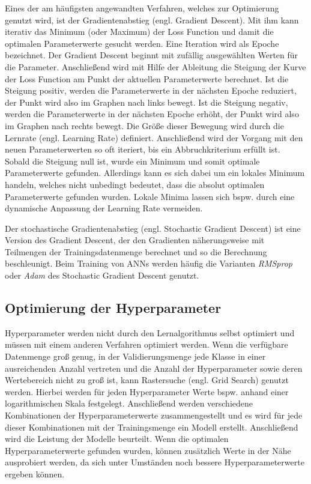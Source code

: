 Eines der am häufigsten angewandten Verfahren, welches zur Optimierung genutzt wird, ist der Gradientenabstieg (engl. Gradient Descent). Mit ihm kann iterativ das Minimum (oder Maximum) der Loss Function und damit die optimalen Parameterwerte gesucht werden. Eine Iteration wird als Epoche bezeichnet. Der Gradient Descent beginnt mit zufällig ausgewählten Werten für die Parameter. Anschließend wird mit Hilfe der Ableitung die Steigung der Kurve der Loss Function am Punkt der aktuellen Parameterwerte berechnet. Ist die Steigung positiv, werden die Parameterwerte in der nächsten Epoche reduziert, der Punkt wird also im Graphen nach links bewegt. Ist die Steigung negativ, werden die Parameterwerte in der nächsten Epoche erhöht, der Punkt wird also im Graphen nach rechts bewegt. Die Größe dieser Bewegung wird durch die Lernrate (engl. Learning Rate) definiert. Anschließend wird der Vorgang mit den neuen Parameterwerten so oft iteriert, bis ein Abbruchkriterium erfüllt ist. Sobald die Steigung null ist, wurde ein Minimum und somit optimale Parameterwerte gefunden. Allerdings kann es sich dabei um ein lokales Minimum handeln, welches nicht unbedingt bedeutet, dass die absolut optimalen Parameterwerte gefunden wurden. Lokale Minima lassen sich bspw. durch eine dynamische Anpassung der Learning Rate vermeiden. \cite{nguyen_machine_2018}

Der stochastische Gradientenabstieg (engl. Stochastic Gradient Descent) ist eine Version des Gradient Descent, der den Gradienten näherungsweise mit Teilmengen der Trainingsdatenmenge berechnet und so die Berechnung beschleunigt. Beim Training von \gls{ANN}s werden häufig die Varianten \textit{RMSprop} oder \textit{Adam} des Stochastic Gradient Descent genutzt. \cite{burkov_machine_2019}

\subsection{Optimierung der Hyperparameter} 

Hyperparameter werden nicht durch den Lernalgorithmus selbst optimiert und müssen mit einem anderen Verfahren optimiert werden. Wenn die verfügbare Datenmenge groß genug, in der Validierungsmenge jede Klasse in einer ausreichenden Anzahl vertreten und die Anzahl der Hyperparameter sowie deren Wertebereich nicht zu groß ist, kann Rastersuche (engl. Grid Search) genutzt werden. Hierbei werden für jeden Hyperparameter Werte bspw. anhand einer logarithmischen Skala festgelegt. Anschließend werden verschiedene Kombinationen der Hyperparameterwerte zusammengestellt und es wird für jede dieser Kombinationen mit der Trainingsmenge ein Modell erstellt. Anschließend wird die Leistung der Modelle beurteilt. Wenn die optimalen Hyperparameterwerte gefunden wurden, können zusätzlich Werte in der Nähe ausprobiert werden, da sich unter Umständen noch bessere Hyperparameterwerte ergeben können. \cite{burkov_machine_2019}

